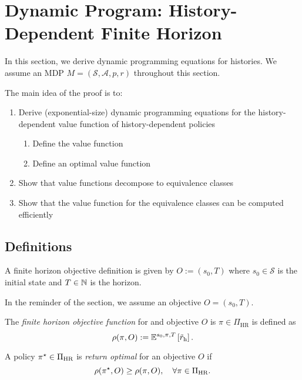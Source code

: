 \section{Dynamic Program: History-Dependent Finite Horizon}

In this section, we derive dynamic programming equations for histories. We assume an MDP $M = (\mathcal{S}, \mathcal{A}, p, r)$ throughout this section.

The main idea of the proof is to:
\begin{enumerate}
\item Derive (exponential-size) dynamic programming equations for the history-dependent value function of history-dependent policies
  \begin{enumerate}
    \item Define the value function
    \item Define an optimal value function
  \end{enumerate}
\item Show that value functions decompose to equivalence classes
\item Show that the value function for the equivalence classes can be computed efficiently
\end{enumerate}

\subsection{Definitions}

\begin{definition} \label{def:ObjectiveFH}
  A finite horizon objective definition is given by $O := (s_0, T)$ where $s_0\in \mathcal{S}$ is the initial state and $T\in \mathbb{N}$ is the horizon.
   \leanok
\end{definition}

In the reminder of the section, we assume an objective $O = (s_0, T)$.

\begin{definition} \label{sec:objective-fh}
  The \emph{finite horizon objective function} for and objective $O$ is $\pi\in \Pi_{\mathrm{HR}}$ is defined as
  \[
    \rho(\pi, O)
    :=
    \mathbb{E}^{s_0, \pi, T} \left[\tilde{r}_{\mathrm{h}} \right].
  \]
   \leanok
\end{definition}

\begin{definition}\label{def:optimal-fh}
  A policy $\pi^{\star}\in \Pi_{\mathrm{HR}}$ is \emph{return optimal} for an objective $O$ if
  \[
   \rho(\pi^{\star}, O) \ge \rho(\pi, O), \quad \forall \pi \in \Pi_{\mathrm{HR}}.
 \]
  \leanok
\end{definition}

